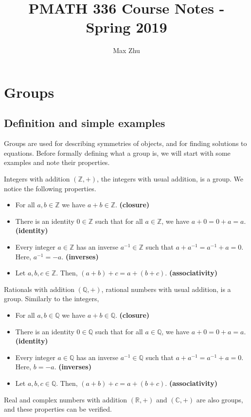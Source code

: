 \documentclass[12pt]{article}
\title{PMATH 336 Course Notes - Spring 2019}
\author{Max Zhu}
\newcommand{\R}{\mathbb{R}}
\newcommand{\Z}{\mathbb{Z}}
\newcommand{\Q}{\mathbb{Q}}
\renewcommand{\C}{\mathbb{C}}
\newcommand{\inv}{^{-1}}
\begin{document}
	\maketitle
	\tableofcontents\newpage
	
	\section{Groups}
	\subsection{Definition and simple examples}
	Groups are used for describing symmetries of objects, and for finding solutions to equations. Before formally defining what a group is, we will start with some examples and note their properties.
	\begin{myex}{Integers with addition}{}
		$(\Z, +)$, the integers with usual addition, is a group. We notice the following properties.
		\begin{itemize}
			\item For all $a, b\in\Z$ we have $a+b\in\Z$. \textbf{(closure)}
			\item There is an identity $0\in\Z$ such that for all $a\in\Z$, we have $a+0=0+a=a$. \textbf{(identity)}
			\item Every integer $a\in\Z$ has an inverse $a\inv\in\Z$ such that $a+a\inv=a\inv+a=0$. Here, $a\inv=-a$. \textbf{(inverses)}
			\item Let $a, b, c\in\Z$. Then, $(a+b)+c=a+(b+c)$. \textbf{(associativity)}
		\end{itemize}
	\end{myex}
	
	\begin{myex}{Rationals with addition}{}
		$(\Q, +)$, rational numbers with usual addition, is a group. Similarly to the integers,
		\begin{itemize}
			\item For all $a, b\in\Q$ we have $a+b\in\Q$. \textbf{(closure)}
			\item There is an identity $0\in\Q$ such that for all $a\in\Q$, we have $a+0=0+a=a$. \textbf{(identity)}
			\item Every integer $a\in\Q$ has an inverse $a\inv\in\Q$ such that $a+a\inv=a\inv+a=0$. Here, $b=-a$. \textbf{(inverses)}
			\item Let $a, b, c\in\Q$. Then, $(a+b)+c=a+(b+c)$. \textbf{(associativity)}
		\end{itemize}
	\end{myex}
	\begin{myex}{Real and complex numbers with addition}{}
		$(\R, +)$ and $(\C, +)$ are also groups, and these properties can be verified.
	\end{myex}
	
\end{document}
